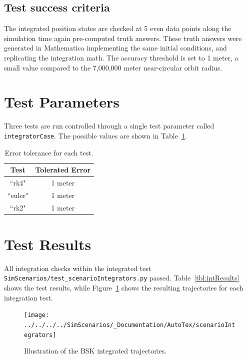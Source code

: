 \subsection{Test success criteria}
The integrated position states are checked at 5 even data points along the simulation time again pre-computed truth answers.  These truth answers were generated in Mathematica implementing the same initial conditions, and replicating the integration math.    The accuracy threshold is set to 1 meter, a small value compared to the 7,000,000 meter near-circular orbit radius.  



\section{Test Parameters}
Three tests are run controlled through a single test parameter called {\tt integratorCase}.  The possible values are shown in Table~\ref{tbl:intCases}.  

\begin{table}[htbp]
	\caption{Error tolerance for each test.}
	\label{tbl:intCases}
	\centering \fontsize{10}{10}\selectfont
	\begin{tabular}{ c | c } %
		\hline\hline
		\textbf{Test}   	      	               & \textbf{Tolerated Error} 						           \\ \hline
		``rk4"                           & 1 meter	  \\ 
		``euler"                           & 1 meter	  \\ 
		``rk2"                           & 1 meter	  \\ 
		\hline\hline
	\end{tabular}
\end{table}

\section{Test Results}
All integration checks within the integrated test {\tt SimScenarios/test\_scenarioIntegrators.py} passed.  Table~\ref{tbl:intResults} shows the test results, while Figure~\ref{fig:intResultsPython} shows the resulting trajectories for each integration test.

\begin{figure}[t]
	\centerline{
		\texttt{[image: ../../../../SimScenarios/\_Documentation/AutoTex/scenarioIntegrators]}
	}
	\caption{Illustration of the BSK integrated trajectories.}
	\label{fig:intResultsPython}
\end{figure}

